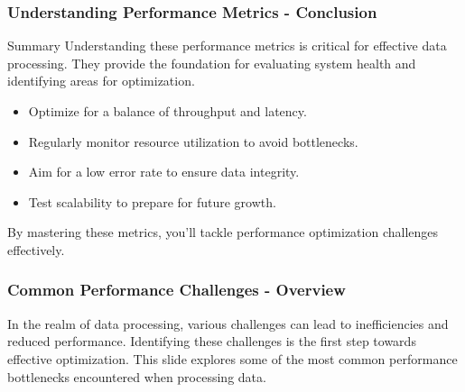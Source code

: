 \documentclass[aspectratio=169]{beamer}
\begin{document}
\begin{frame}[fragile]
    \frametitle{Understanding Performance Metrics - Conclusion}
    \begin{block}{Summary}
        Understanding these performance metrics is critical for effective data processing. They provide the foundation for evaluating system health and identifying areas for optimization.
    \end{block}
    \begin{itemize}
        \item Optimize for a balance of throughput and latency.
        \item Regularly monitor resource utilization to avoid bottlenecks.
        \item Aim for a low error rate to ensure data integrity.
        \item Test scalability to prepare for future growth.
    \end{itemize}
    By mastering these metrics, you'll tackle performance optimization challenges effectively.
\end{frame}

\begin{frame}[fragile]
    \frametitle{Common Performance Challenges - Overview}
    In the realm of data processing, various challenges can lead to inefficiencies and reduced performance. 
    Identifying these challenges is the first step towards effective optimization. 
    This slide explores some of the most common performance bottlenecks encountered when processing data.
\end{frame}
\end{document}
